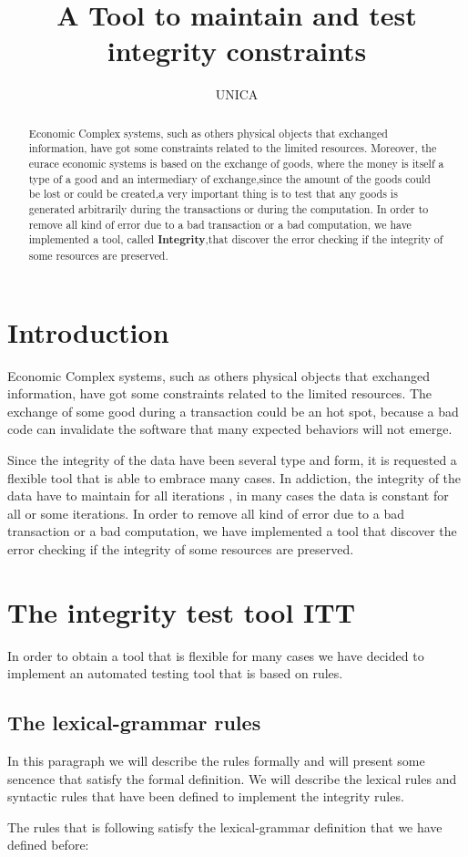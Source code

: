 \documentclass[a4paper,10pt]{article}
\title{A Tool to maintain and test integrity constraints }
\author{UNICA}
\begin{document}
\maketitle



\begin{abstract} 
Economic Complex systems, such as others  physical objects that exchanged information, have got some constraints related to the limited resources. Moreover, the eurace economic systems is based on the exchange of goods, where the money is itself a type of a good and an intermediary of exchange,since the amount of the goods could be lost or could be created,a very important thing is to test that any goods is generated arbitrarily during the transactions or during the computation. 
In order to remove all kind of error due to a bad transaction or a bad computation, we have implemented a tool, called \textbf{Integrity},that discover the error checking if the integrity of some resources are preserved. 
\end{abstract}
\tableofcontents

\section{Introduction}
Economic Complex systems, such as others  physical objects that exchanged information, have got some constraints related to the limited resources. The exchange of some good during a transaction could be an hot spot, because a bad code can invalidate the software that many expected behaviors will not emerge.

Since the integrity of the data have been several type and form, it is requested a flexible tool that is able to embrace many cases. In addiction, the integrity of the data have to maintain for all iterations , in many cases the data is constant for all or some iterations.
In order to remove all kind of error due to a bad transaction or a bad computation, we have implemented a tool that discover the error checking if the integrity of some resources are preserved. 
\section{The  integrity test tool ITT}
In order to obtain a tool that is flexible for many cases we have decided to implement an automated testing tool that is based on rules.
\subsection{The lexical-grammar rules}
In this paragraph we will describe the rules formally and will present some sencence that satisfy the formal definition. We will describe the lexical rules and syntactic rules that have been defined to implement the integrity rules.  

The rules that is following satisfy the lexical-grammar definition that we have defined before:

\end{document}
